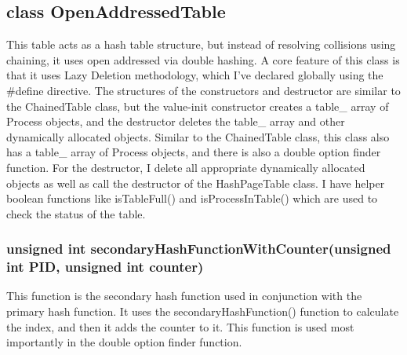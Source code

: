 \documentclass[a4paper]{article}
\begin{document}
    \subsection{{\color{orange}class} {\color{draculapurple}OpenAddressedTable}}
    This table acts as a hash table structure, but instead of resolving collisions using chaining, it uses open addressed via double hashing.
    A core feature of this class is that it uses Lazy Deletion methodology, which I've declared globally using the {\color{orange}\#define} directive.
    The structures of the constructors and destructor are similar to the {\color{draculapurple}ChainedTable} class, but the value-init {\color{draculapurple}constructor} creates a {\color{Turquoise}table\_} array of {\color{draculapurple}Process} objects, and the {\color{draculapurple}destructor} deletes the {\color{Turquoise}table\_} array and other dynamically allocated objects.
    Similar to the {\color{draculapurple}ChainedTable} class, this class also has a {\color{Turquoise}table\_} array of {\color{draculapurple}Process} objects, and there is also a double option finder function.
    For the destructor, I delete all appropriate dynamically allocated objects as well as call the destructor of the {\color{draculapurple}HashPageTable} class.
    I have helper boolean functions like {\color{draculapurple}isTableFull()} and {\color{draculapurple}isProcessInTable()} which are used to check the status of the table.

    \subsubsection{{\color{orange}unsigned int} {\color{draculapurple}secondaryHashFunctionWithCounter}({\color{orange}unsigned int} PID, {\color{orange}unsigned int} counter)}
    This function is the secondary hash function used in conjunction with the primary hash function. It uses the {\color{draculapurple}secondaryHashFunction()} function to calculate the index, and then it adds the {\color{orange}counter} to it.
    This function is used most importantly in the double option finder function.
\end{document}
